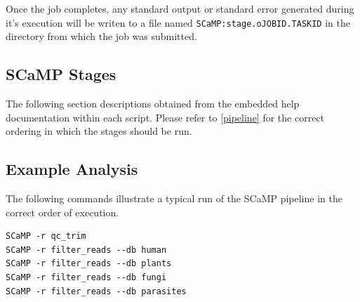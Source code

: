 \documentclass[a4paper,10pt]{article}
\begin{document}
Once the job completes, any standard output or standard error generated during
it's execution will be writen to a file named {\tt SCaMP:stage.oJOBID.TASKID}
in the directory from which the job was submitted.

\subsection{SCaMP Stages}

The following section descriptions obtained from the embedded help
documentation within each script. Please refer to \ref{pipeline} for the
correct ordering in which the stages should be run.




\subsection{Example Analysis}

The following commands illustrate a typical run of the SCaMP pipeline in the correct order of execution.

\begin{verbatim}
SCaMP -r qc_trim
SCaMP -r filter_reads --db human
SCaMP -r filter_reads --db plants 
SCaMP -r filter_reads --db fungi
SCaMP -r filter_reads --db parasites
\end{verbatim}
\end{document}
